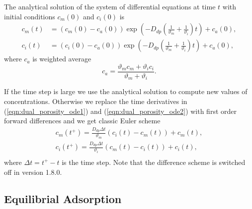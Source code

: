 The analytical solution of the system of differential equations at time $t$ with initial conditions $c_m(0)$ and $c_i(0)$ is
\begin{align}
     c_m(t) &= (c_m(0) - c_a(0)) \exp\left(- D_{dp}\left(\frac{1}{\vartheta_m} + \frac{1}{\vartheta_i}\right) t \right) + c_a(0), \\
     c_i(t) &= (c_i(0) - c_a(0)) \exp\left(- D_{dp}\left(\frac{1}{\vartheta_m} + \frac{1}{\vartheta_i}\right) t \right) + c_a(0),
\end{align}
where $c_a$ is weighted average
\[
  c_a = \frac{\vartheta_m c_m + \vartheta_i c_i}{\vartheta_m + \vartheta_i}.
\]

If the time step is large we use the analytical solution to compute new values of concentrations. 
Otherwise we replace the time derivatives in (\ref{eqn:dual_porosity_ode1}) and (\ref{eqn:dual_porosity_ode2}) 
with first order forward differences and we get classic Euler scheme
\begin{align}
  c_m(t^+) = \frac{D_{dp} \Delta t}{\vartheta_m}(c_i(t) - c_m(t)) + c_m(t), \\
  c_i(t^+) = \frac{D_{dp} \Delta t}{\vartheta_i}(c_m(t) - c_i(t)) + c_i(t), \\
\end{align}
where $\Delta t = t^+ - t$ is the time step. Note that the difference scheme is switched off in version 1.8.0.

\subsection{Equilibrial Adsorption}
\label{sec:sorp_math}

